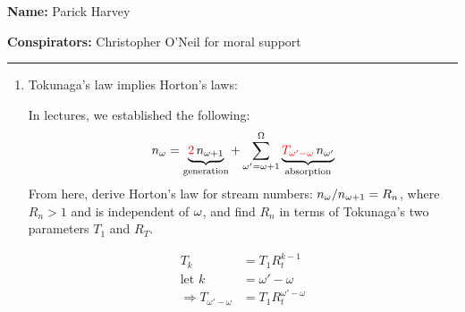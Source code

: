 \textbf{Name:} Parick Harvey\\

\medskip

\textbf{Conspirators:} Christopher O'Neil for moral support

\medskip
\medskip

\hrule

\medskip


\assignmentsonly{\pleasesubmitprojectdraft}

\begin{enumerate}

\item 
  Tokunaga's law implies Horton's laws:

  In lectures, we established the following:
  $$
  n_\omega
  =
  \underbrace{\textcolor{red}{2}\, n_{\omega+1}}_{\rm generation}
  +
  \sum_{\omega'=\omega+1}^{\Omega}
  \underbrace{\textcolor{red}{T_{\omega'-\omega}}\, n_{\omega'}}_{\rm absorption}
  $$
  From here, derive Horton's law for stream numbers: $n_{\omega}/n_{\omega+1} = R_n$,
  where $R_n > 1$ and is independent of $\omega$, and find
  $R_n$ in terms of Tokunaga's two parameters $T_1$ and $R_T$.

  
   \solutionstart
   \begin{align}
   T_{k} &= T_{1} R_{t}^{k-1}\\
   \text{let } k &= \omega\mathsf{'}-\omega\\
   \Rightarrow T_{\omega\mathsf{'}-\omega} &=
        T_{1}
        R_{t}^
            {\omega\mathsf{'}-\omega}
    \end{align}

\clearpage


\end{enumerate}
